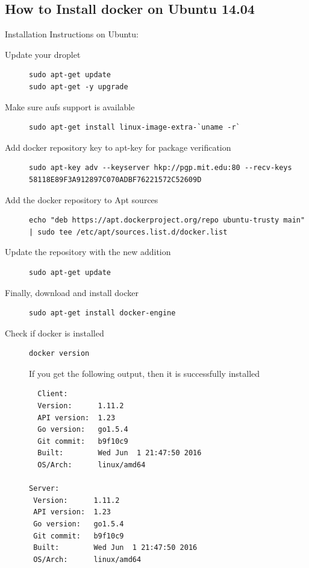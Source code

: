 \documentclass[11pt]{article}
\begin{document}
\subsection{How to Install docker on Ubuntu 14.04}
\label{sec:orgheadline7}
Installation Instructions on Ubuntu:
\begin{description}
\item[{Update your droplet}] \begin{verbatim}
sudo apt-get update
sudo apt-get -y upgrade
\end{verbatim}
\item[{Make sure aufs support is available}] \begin{verbatim}
sudo apt-get install linux-image-extra-`uname -r`
\end{verbatim}
\item[{Add docker repository key to apt-key for package verification}] \begin{verbatim}
sudo apt-key adv --keyserver hkp://pgp.mit.edu:80 --recv-keys 58118E89F3A912897C070ADBF76221572C52609D
\end{verbatim}
\item[{Add the docker repository to Apt sources}] \begin{verbatim}
echo "deb https://apt.dockerproject.org/repo ubuntu-trusty main" | sudo tee /etc/apt/sources.list.d/docker.list
\end{verbatim}
\item[{Update the repository with the new addition}] \begin{verbatim}
sudo apt-get update
\end{verbatim}
\item[{Finally, download and install docker}] \begin{verbatim}
sudo apt-get install docker-engine
\end{verbatim}
\item[{Check if docker is installed}] \begin{verbatim}
docker version
\end{verbatim}
If you get the following output, then it is successfully installed
\begin{verbatim}
  Client:
  Version:      1.11.2
  API version:  1.23
  Go version:   go1.5.4
  Git commit:   b9f10c9
  Built:        Wed Jun  1 21:47:50 2016
  OS/Arch:      linux/amd64

Server:
 Version:      1.11.2
 API version:  1.23
 Go version:   go1.5.4
 Git commit:   b9f10c9
 Built:        Wed Jun  1 21:47:50 2016
 OS/Arch:      linux/amd64
\end{verbatim}
\end{description}
\end{document}
